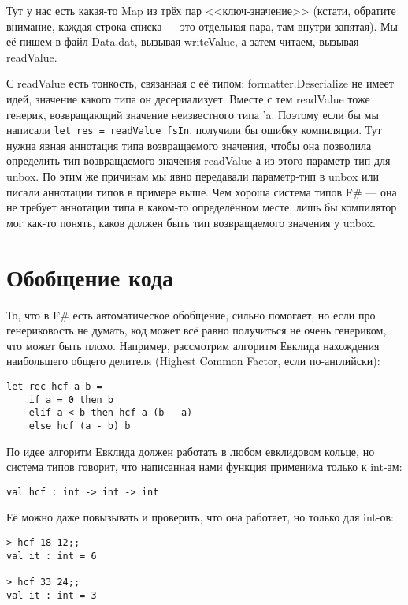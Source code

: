 \documentclass{../../text-style}
\begin{document}
Тут у нас есть какая-то Map из трёх пар <<ключ-значение>> (кстати, обратите внимание, каждая строка списка --- это отдельная пара, там внутри запятая). Мы её пишем в файл Data.dat, вызывая writeValue, а затем читаем, вызывая readValue. 

С readValue есть тонкость, связанная с её типом: formatter.Deserialize не имеет идей, значение какого типа он десериализует. Вместе с тем readValue тоже генерик, возвращающий значение неизвестного типа 'a. Поэтому если бы мы написали \texttt{let res = readValue fsIn}, получили бы ошибку компиляции. Тут нужна явная аннотация типа возвращаемого значения, чтобы она позволила определить тип возвращаемого значения readValue а из этого параметр-тип для unbox. По этим же причинам мы явно передавали параметр-тип в unbox или писали аннотации типов в примере выше. Чем хороша система типов F\# --- она не требует аннотации типа в каком-то определённом месте, лишь бы компилятор мог как-то понять, каков должен быть тип возвращаемого значения у unbox.

\section{Обобщение кода}

То, что в F\# есть автоматическое обобщение, сильно помогает, но если про генериковость не думать, код может всё равно получиться не очень генериком, что может быть плохо. Например, рассмотрим алгоритм Евклида нахождения наибольшего общего делителя (Highest Common Factor, если по-английски):

\begin{verbatim}
let rec hcf a b =
    if a = 0 then b
    elif a < b then hcf a (b - a)
    else hcf (a - b) b
\end{verbatim}

По идее алгоритм Евклида должен работать в любом евклидовом кольце, но система типов говорит, что написанная нами функция применима только к int-ам:

\begin{verbatim}
val hcf : int -> int -> int
\end{verbatim}

Её можно даже повызывать и проверить, что она работает, но только для int-ов:

\begin{verbatim}
> hcf 18 12;;
val it : int = 6

> hcf 33 24;;
val it : int = 3
\end{verbatim}
\end{document}
